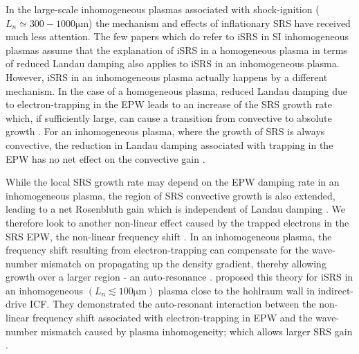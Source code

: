  In the large-scale inhomogeneous plasmas associated with shock-ignition ($L_n \simeq 300-1000 \si{\micro\metre}$) the mechanism and effects of inflationary SRS have received much less attention. The few papers which do refer to iSRS in SI inhomogeneous plasmas assume that the explanation of iSRS in a homogeneous plasma in terms of reduced Landau damping also applies to iSRS in an inhomogeneous plasma. However, iSRS in an inhomogeneous plasma actually happens by a different mechanism. In the case of a homogeneous plasma, reduced Landau damping due to electron-trapping in the EPW leads to an increase of the SRS growth rate which, if sufficiently large, can cause a transition from convective to absolute growth \citep{Wang2018}. For an inhomogeneous plasma, where the growth of SRS is always convective, the reduction in Landau damping associated with trapping in the EPW has no net effect on the convective gain \citep{Williams1991}.
 
 While the local SRS growth rate may depend on the EPW damping rate in an inhomogeneous plasma, the region of SRS convective growth is also extended, leading to a net Rosenbluth gain \citep{Rosenbluth1972} which is independent of Landau damping \citep{Williams1991,Liu1994}. We therefore look to another non-linear effect caused by the trapped electrons in the SRS EPW, the non-linear frequency shift \citep{Morales1972}. In an inhomogeneous plasma, the frequency shift resulting from electron-trapping can compensate for the wave-number mismatch on propagating up the density gradient, thereby allowing
 growth over a larger region - an auto-resonance \citep{Chapman2010,Chapman2012}. \citet{Chapman2012} proposed this theory for iSRS in an inhomogeneous $(L_n \lesssim 100
 \si{\micro\metre})$ plasma close to the hohlraum wall in indirect-drive ICF. They demonstrated the auto-resonant
 interaction \cite{Chapman2010} between the non-linear frequency shift associated with electron-trapping in EPW
 and the wave-number mismatch caused by plasma inhomogeneity; which allows larger SRS gain \cite{Chapman2012}.


